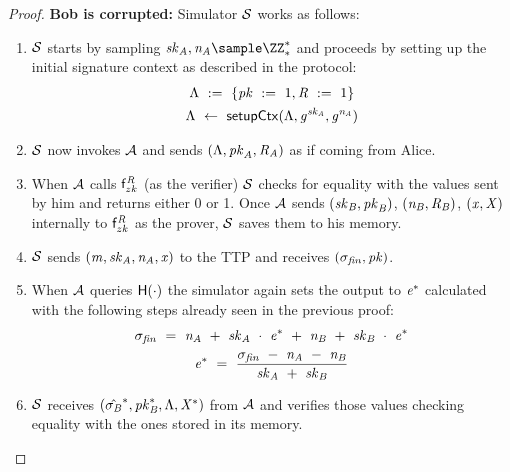 \begin{proof}
    \textbf{Bob is corrupted: } Simulator $\mathcal{S}$ works as follows:
    \begin{enumerate}
        \item $\mathcal{S}$ starts by sampling $\varSecKeyAlice, \varNonceAlice \sample \cnstIntegersPrimeWithoutZero{*}$ and proceeds by setting up the initial signature context as described in the protocol:
        \begin{gather*}
            \Lambda ~:=~ \{ \mathit{pk} ~:=~ 1, \mathit{R} ~:=~ 1 \} \\
            \Lambda ~\leftarrow~ \mathsf{setupCtx}( \Lambda, \mathit{g}^{\mathit{sk}_{\mathit{A}}}, \mathit{g}^{\mathit{\mathit{n}_{\mathit{A}}}} ) \\
        \end{gather*}
        \item $\mathcal{S}$ now invokes $\mathcal{A}$ and sends $(\Lambda, \mathit{pk}_{\mathit{A}}, \mathit{R}_{\mathit{A}})$ as if coming from Alice.
        \item When $\mathcal{A}$ calls $\mathsf{f}^{\mathit{R}}_{zk}$ (as the verifier) $\mathcal{S}$ checks for equality with the values sent by him and returns either 0 or 1.
        Once $\mathcal{A}$ sends $(\mathit{sk}_{\mathit{B}}, \mathit{pk}_{\mathit{B}})$, $(\mathit{\mathit{n}_{\mathit{B}}}, \mathit{R}_{\mathit{B}})$, $(\mathit{x}, \mathit{X})$ internally to $\mathsf{f}^{\mathit{R}}_{zk}$ as the prover, $\mathcal{S}$ saves them to his memory.
        \item $\mathcal{S}$ sends $(\mathit{m}, \mathit{sk}_{\mathit{A}}, \mathit{\mathit{n}_{\mathit{A}}}, \mathit{x})$ to the TTP and receives $(\sigma_{\mathit{fin}}, \mathit{pk})$.
        \item When $\mathcal{A}$ queries $\mathsf{H} (\cdot)$ the simulator again sets the output to $\mathit{e}^*$ calculated with the following steps already seen in the previous proof:
        \begin{gather*}
            \sigma_{\mathit{fin}} ~=~ \mathit{\mathit{n}_{\mathit{A}}} ~+~ \mathit{sk}_{\mathit{A}} ~\cdot~ \mathit{e}^* ~+~ \mathit{\mathit{n}_{\mathit{B}}} ~+~ \mathit{sk}_{\mathit{B}} ~\cdot~ \mathit{e}^* \\
            \mathit{e}^* ~=~ \frac{\sigma_{\mathit{fin}} ~-~ \mathit{\mathit{n}_{\mathit{A}}} ~-~ \mathit{\mathit{n}_{\mathit{B}}}}{\mathit{sk}_{\mathit{A}} ~+~ \mathit{sk}_{\mathit{B}}}
        \end{gather*}
        \item $\mathcal{S}$ receives $(\hat{\sigma_{\mathit{B}}}^*, \mathit{pk}_{\mathit{B}}^*, \Lambda, \mathit{X}^*)$ from $\mathcal{A}$ and verifies those values checking equality with the ones stored in its memory.

\end{enumerate}
\end{proof}
